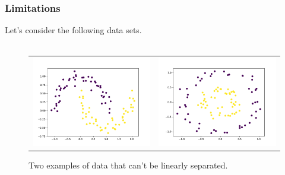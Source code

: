 \documentclass{beamer}
\begin{document}
\begin{frame}{}
    \frametitle{Limitations}
    Let's consider the following data sets. \\~\\ 
    \begin{figure}[h]
    	\begin{tabular}{ll}
    		\includegraphics[scale=0.35]{img/moonshape.png}
    		&
    		\includegraphics[scale=0.35]{img/circleshape.png}
    	\end{tabular}
    	\caption{Two examples of data that can't be linearly separated.}
    	\label{Fig:nonlineardata}
    \end{figure}
\end{frame}
\end{document}
